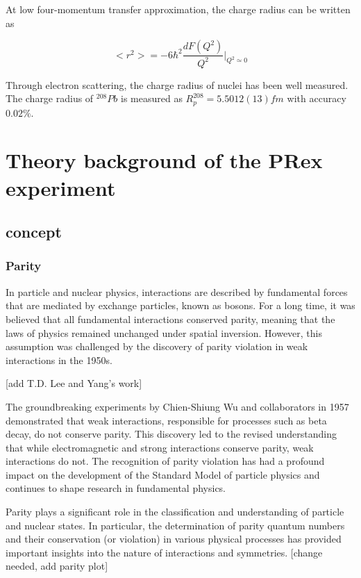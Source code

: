 At low four-momentum transfer approximation, the charge radius can be written as

\begin{equation}
    <r^2> = -6\hbar^2\frac{dF(Q^2)}{Q^2}|_{Q^2\simeq0}
\end{equation}

Through electron scattering, the charge radius of nuclei has been well measured. The charge radius of $^{208}Pb$ is measured as $R^{208}_{p} = 5.5012(13)fm$ with accuracy $0.02\%$\cite{ANGELI201369}.


\section{Theory background of the PRex experiment}

\subsection{concept}
\subsubsection{Parity}
In particle and nuclear physics, interactions are described by fundamental forces that are mediated by exchange particles, known as bosons. For a long time, it was believed that all fundamental interactions conserved parity, meaning that the laws of physics remained unchanged under spatial inversion. However, this assumption was challenged by the discovery of parity violation in weak interactions in the 1950s.

[add T.D. Lee and Yang's work]

The groundbreaking experiments by Chien-Shiung Wu and collaborators in 1957 demonstrated that weak interactions, responsible for processes such as beta decay, do not conserve parity. This discovery led to the revised understanding that while electromagnetic and strong interactions conserve parity, weak interactions do not. The recognition of parity violation has had a profound impact on the development of the Standard Model of particle physics and continues to shape research in fundamental physics.

Parity plays a significant role in the classification and understanding of particle and nuclear states. In particular, the determination of parity quantum numbers and their conservation (or violation) in various physical processes has provided important insights into the nature of interactions and symmetries.
[change needed, add parity plot]

